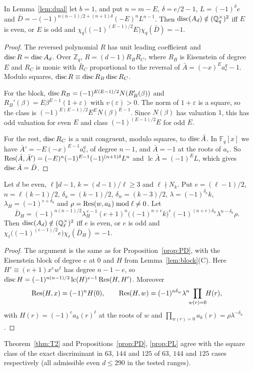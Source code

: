 \documentclass[11pt]{amsart}
\theoremstyle{definition}\newtheorem{definition}[theorem]{Definition}\newtheorem{example}[theorem]{Example}
\theoremstyle{remark}\newtheorem{remark}[theorem]{Remark}
\newcommand{\Q}{\mathbb Q}\newcommand{\Z}{\mathbb Z}\newcommand{\F}{\mathbb F}
\newcommand{\lead}{\operatorname{lc}}\newcommand{\ur}{\mathrm{ur}}\newcommand{\supp}{\operatorname{supp}}
\begin{document}
\begin{proposition}\label{prop:PD}
In Lemma~\ref{lem:dual} let $b=1$, and put $n=m-E$, $\delta=e/2-1$, $L=(-1)^\delta e$ and
$\bar D=-(-1)^{n(n-1)/2+(n+1)\delta}(-E)^nL^{n-1}$. Then $\disc(A_d)\notin(\Q_q^\times)^2$ iff $E$ is even, or $E$ is odd and
$\chi_q\bigl((-1)^{(E-1)/2}E\bigr)\chi_q(\bar D)=-1$.
\end{proposition}
\begin{proof}
The reversed polynomial $R$ has unit leading coefficient and $\operatorname{disc} R=\operatorname{disc} A_d$. Over $\Z_q$, $R=(d-1)R_BR_C$, where $R_B$ is Eisenstein of degree
$E$ and $R_C$ is monic with $\bar R_C$ proportional to the reversal of $\bar A=(-x)^Ea_e^q-1$. Modulo squares, $\operatorname{disc} R\equiv\operatorname{disc} R_B\operatorname{disc} R_C$.

For the block, $\operatorname{disc} R_B=(-1)^{E(E-1)/2}N(R_B'(\beta))$ and $R_B'(\beta)=E\beta^{E-1}(1+\varepsilon)$ with $v(\varepsilon)>0$. The norm of $1+\varepsilon$
is a square, so the class is $(-1)^{E(E-1)/2}E^EN(\beta)^{E-1}$. Since $N(\beta)$ has valuation $1$, this has odd valuation for even $E$ and
class $(-1)^{(E-1)/2}E$ for odd $E$.

For the rest, $\operatorname{disc} R_C$ is a unit congruent, modulo squares, to $\operatorname{disc}\bar A$. In $\F_q[x]$ we have $\bar A'=-E(-x)^{E-1}a_e^q$, of degree $n-1$,
and $\bar A=-1$ at the roots of $a_e$. So $\operatorname{Res}(\bar A,\bar A')=(-E)^n(-1)^{E-1}(-1)^{(n+1)\delta}L^n$ and $\lead\bar A=(-1)^EL$, which gives
$\operatorname{disc}\bar A=\bar D$.
\end{proof}

\begin{proposition}\label{prop:PL}
Let $d$ be even, $\ell\Vert d-1$, $k=(d-1)/\ell\ge3$ and $\ell\nmid N_k$. Put $e=(\ell-1)/2$, $n=\ell(k-1)/2$, $\delta_a=(k-1)/2$,
$\delta_w=(k-3)/2$, $\lambda=(-1)^{\delta_a}k$, $\lambda_H=(-1)^{e+\delta_a}$ and $\rho=\operatorname{Res}(w,a_k)\bmod\ell\ne0$. Let
\[\bar D_H=(-1)^{n(n-1)/2}\lambda_H^{\,e-1}(e+1)^n\bigl((-1)^{n+e}k\bigr)^e(-1)^{(n+e)\delta_w}\lambda^{n-\delta_a}\rho .\]
Then $\disc(A_d)\notin(\Q_\ell^\times)^2$ iff $e$ is even, or $e$ is odd and $\chi_\ell\bigl((-1)^{(e-1)/2}e\bigr)\chi_\ell(\bar D_H)=-1$.
\end{proposition}
\begin{proof}
The argument is the same as for Proposition~\ref{prop:PD}, with the Eisenstein block of degree $e$ at $0$ and $H$ from Lemma~\ref{lem:block}(C).
Here $H'\equiv(e+1)x^ew^\ell$ has degree $n-1-e$, so $\disc H=(-1)^{n(n-1)/2}\lead(H)^{e-1}\Res(H,H')$. Moreover
\[\operatorname{Res}(H,x)=(-1)^nH(0),\qquad \operatorname{Res}(H,w)=(-1)^{n\delta_w}\lambda^n\!\!\prod_{w(r)=0}\!\!H(r),\]
with $H(r)=(-1)^ea_k(r)^\ell$ at the roots of $w$ and $\prod_{w(r)=0}a_k(r)=\rho\lambda^{-\delta_a}$.
\end{proof}
Theorem~\ref{thm:T2} and Propositions~\ref{prop:PD}, \ref{prop:PL} agree with the square class of the exact discriminant in $63$, $144$ and $125$ of
$63$, $144$ and $125$ cases respectively (all admissible even $d\le290$ in the tested ranges).
\end{document}
